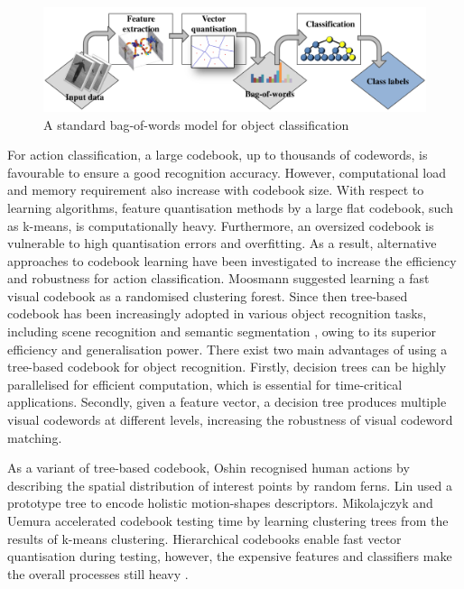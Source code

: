 \begin{figure}[t]
	\centering  	
	\includegraphics[width=1\linewidth]{fig/act/bow.pdf}
	\caption{A standard bag-of-words model for object classification}
	\label{fig/act/bow}
\end{figure}


For action classification, a large codebook, \eg up to thousands of codewords, is favourable to ensure a good recognition accuracy. However, computational load and memory requirement also increase with codebook size. With respect to learning algorithms, feature quantisation methods by a large flat codebook, such as k-means, is computationally heavy. Furthermore, an oversized codebook is vulnerable to high quantisation errors and overfitting. As a result, alternative approaches to codebook learning have been investigated to increase the efficiency and robustness for action classification. 
Moosmann \etal \cite{Moosmann2007} suggested learning a fast visual codebook as a randomised clustering forest. Since then tree-based codebook has been increasingly adopted in various object recognition tasks, including scene recognition \cite{Bosch2007} and semantic segmentation \cite{Shotton2008}, owing to its superior efficiency and generalisation power.
There exist two main advantages of using a tree-based codebook for object recognition. 
Firstly, decision trees can be highly parallelised for efficient computation, which is essential for time-critical applications. Secondly, given a feature vector, a decision tree produces multiple visual codewords at different levels, increasing the robustness of visual codeword matching. 

As a variant of tree-based codebook, Oshin \etal \cite{Oshin2009} recognised human actions by describing the spatial distribution of interest points by random ferns.  
Lin \etal \cite{Lin2009} used a prototype tree to encode holistic motion-shapes descriptors. 
Mikolajczyk and Uemura \cite{Mikolajczyk2008} accelerated codebook testing time by learning clustering trees from the results of k-means clustering. 
Hierarchical codebooks enable fast vector quantisation during testing, however, the expensive features and classifiers make the overall processes still heavy \cite{Lin2009, Mikolajczyk2008}.


